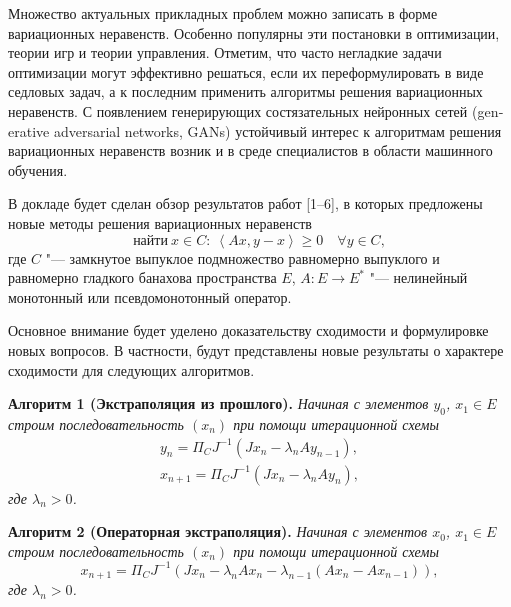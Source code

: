 
\vzmscaption

Множество актуальных прикладных проблем можно записать в форме вариационных неравенств. Особенно популярны эти постановки в оптимизации, теории игр и теории управления. Отметим, что часто негладкие задачи оптимизации могут эффективно решаться, если
их переформулировать в виде седловых задач, а к последним применить алгоритмы решения вариационных неравенств. С появлением
генерирующих состязательных нейронных сетей
\foreignlanguage{english}{(generative adversarial networks, GANs)}
устойчивый интерес к алгоритмам решения вариационных неравенств возник и в среде специалистов в области машинного обучения.

В докладе будет сделан обзор результатов работ [1--6], в которых предложены новые методы решения вариационных неравенств
$$
\mbox{найти} \ x \in C : \ \left\langle Ax, y-x \right\rangle \geq 0\quad \forall y \in C,
$$
где $C$ "--- замкнутое выпуклое подмножество равномерно выпуклого и равномерно гладкого банахова пространства $E$, $A: E \to E^\ast$ "--- нелинейный монотонный или псевдомонотонный оператор.

Основное внимание будет уделено доказательству сходимости и
формулировке новых вопросов. В частности, будут представлены новые результаты о характере сходимости для следующих алгоритмов.

	\textbf{Алгоритм 1 (Экстраполяция из прошлого).} {\it Начиная с элементов $y_0$, $x_1 \in E$ строим последовательность $(x_n)$ при помощи итерационной схемы
$$
\begin{array}{l}
y_{n} = \Pi _{C} J^{-1} \left( Jx_{n} -\lambda_n Ay_{n-1} \right), \\
x_{n+1} = \Pi _{C} J^{-1} \left( Jx_{n} -\lambda_n Ay_{n} \right),
\end{array}
$$
где $\lambda_n >0$.}


\textbf{Алгоритм 2 (Операторная экстраполяция).} {\it Начиная с элементов $x_0$, $x_1 \in E$ строим последовательность $(x_n)$ при помощи итерационной схемы
$$
x_{n+1} =\Pi _{C} J^{-1} \left(Jx_{n} -\lambda _{n} Ax_{n} -\lambda _{n-1} \left(Ax_{n} -Ax_{n-1} \right)\right) ,
$$
где $\lambda_n >0$.}


